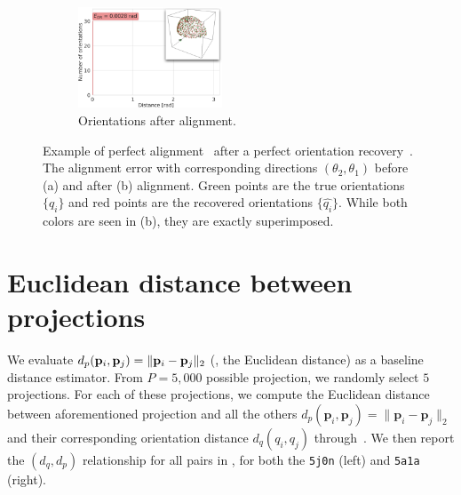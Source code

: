 \begin{figure}[ht!]
\begin{minipage}[t]{0.58\linewidth}
\begin{subfigure}[t]{0.47\linewidth}
        \end{subfigure}
        \hfill
        \begin{subfigure}[t]{0.47\linewidth}
            \centering
            \includegraphics[height=3cm]{figures/AfterAA.pdf}
            \caption{Orientations after alignment.}
        \end{subfigure}
        \caption{%
            Example of perfect alignment~ after a perfect orientation recovery~.
            The alignment error with corresponding directions $(\theta_2, \theta_1)$ before (a) and after (b) alignment.
            Green points are the true orientations $\{q_i\}$ and red points are the recovered orientations $\{\widehat{q_i}\}$.
            While both colors are seen in (b), they are exactly superimposed.
        }\label{fig:5j0n-aa-loss-perfect-distances}
    \end{minipage}
\end{figure}

\section{Euclidean distance between projections}\label{apx:results:distance-estimation}



We evaluate $d_p(\mathbf{p}_i, \mathbf{p}_j) = \Vert \mathbf{p}_i - \mathbf{p}_j \Vert_2$ (\ie, the Euclidean distance) as a baseline distance estimator.
From $P = 5,000$ possible projection, we randomly select $5$ projections.
For each of these projections, we compute the Euclidean distance between aforementioned projection and all the others $d_p(\mathbf{p}_i,\mathbf{p}_j)=\lVert\mathbf{p}_i-\mathbf{p}_j\rVert_2$ and their corresponding orientation distance $d_q(q_i,q_j)$ through~.
We then report the $(d_q,d_p)$ relationship for all pairs in , for both the \texttt{5j0n} (left) and \texttt{5a1a} (right).

